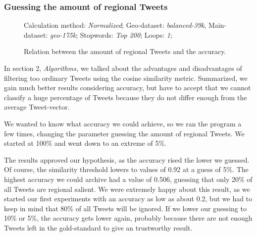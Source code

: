 \documentclass[../Main.tex]{subfiles}
\begin{document}
\subsubsection{Guessing the amount of regional Tweets}
\begin{figure}
Calculation method: \textit{Normalized}; Geo-dataset: \textit{balanced-39k}, Main-dataset: \textit{geo-175k}; Stopwords: \textit{Top 200}; Loops: \textit{1}; 

  \caption{Relation between the amount of regional Tweets and the accuracy.}
  \label{geo_graph2}
\end{figure}
In section 2, \textit{Algorithms,} we talked about the advantages and disadvantages of filtering too ordinary Tweets using the cosine similarity metric. Summarized, we gain much better results considering accuracy, but have to accept that we cannot classify a huge percentage of Tweets because they do not differ enough from the average Tweet-vector.

We wanted to know what accuracy we could achieve, so we ran the program a few times, changing the parameter guessing the amount of regional Tweets. We started at 100\% and went down to an extreme of 5\%.

The results approved our hypothesis, as the accuracy rised the lower we guessed. Of course, the similarity threshold lowers to values of 0.92 at a guess of 5\%. The highest accuracy we could archive had a value of 0.506, guessing that only 20\% of all Tweets are regional salient. We were extremely happy about this result, as we started our first experiments with an accuracy as low as about 0.2, but we had to keep in mind that 80\% of all Tweets will be ignored. If we lower our guessing to 10\% or 5\%, the accuracy gets lower again, probably because there are not enough Tweets left in the gold-standard to give an trustworthy result. 
\end{document}
